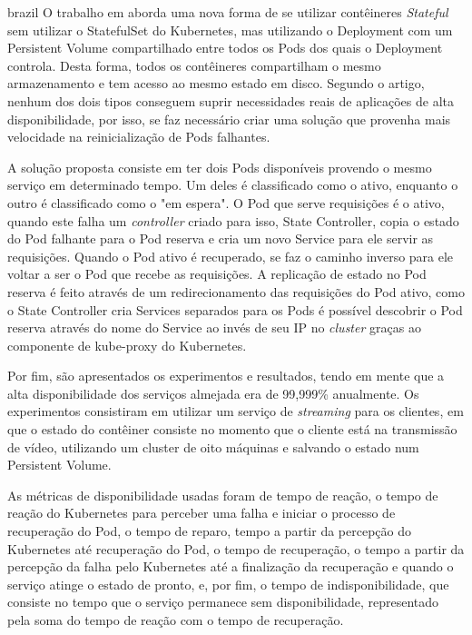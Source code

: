 \begin{otherlanguage*}{brazil}
O trabalho em \cite{vayghan2021kubernetes} aborda uma nova forma de se
utilizar contêineres \textit{Stateful} sem utilizar o StatefulSet do Kubernetes,
mas utilizando o Deployment com um Persistent Volume compartilhado entre todos
os Pods dos quais o Deployment controla. Desta forma, todos os contêineres
compartilham o mesmo armazenamento e tem acesso ao mesmo estado em disco.
Segundo o artigo, nenhum dos dois tipos conseguem suprir necessidades reais de
aplicações de alta disponibilidade, por isso, se faz necessário criar uma
solução que provenha mais velocidade na reinicialização de Pods falhantes.

A solução proposta consiste em ter dois Pods disponíveis provendo o mesmo
serviço em determinado tempo. Um deles é classificado como o ativo, enquanto
o outro é classificado como o "em espera". O Pod que serve requisições é o
ativo, quando este falha um \textit{controller} criado para isso, State Controller,
copia o estado do Pod falhante para o Pod reserva e cria um novo Service para ele
servir as requisições. Quando o Pod ativo é recuperado, se faz o caminho inverso
para ele voltar a ser o Pod que recebe as requisições. A replicação de estado no
Pod reserva é feito através de um redirecionamento das requisições do Pod ativo,
como o State Controller cria Services separados para os Pods é possível descobrir
o Pod reserva através do nome do Service ao invés de seu IP no \textit{cluster}
graças ao componente de kube-proxy do Kubernetes.

Por fim, são apresentados os experimentos e resultados, tendo em mente que a
alta disponibilidade dos serviços almejada era de 99,999\% anualmente. Os
experimentos consistiram em utilizar um serviço de \textit{streaming} para os
clientes, em que o estado do contêiner consiste no momento que o cliente está
na transmissão de vídeo, utilizando um cluster de oito máquinas e salvando o
estado num Persistent Volume.

As métricas de disponibilidade usadas foram de tempo de reação, o tempo de
reação do Kubernetes para perceber uma falha e iniciar o processo de
recuperação do Pod, o tempo de reparo, tempo a partir da percepção do Kubernetes
até recuperação do Pod, o tempo de recuperação, o tempo a partir da percepção
da falha pelo Kubernetes até a finalização da recuperação e quando o serviço
atinge o estado de pronto, e, por fim, o tempo de indisponibilidade, que
consiste no tempo que o serviço permanece sem disponibilidade, representado
pela soma do tempo de reação com o tempo de recuperação.


\end{otherlanguage*}
